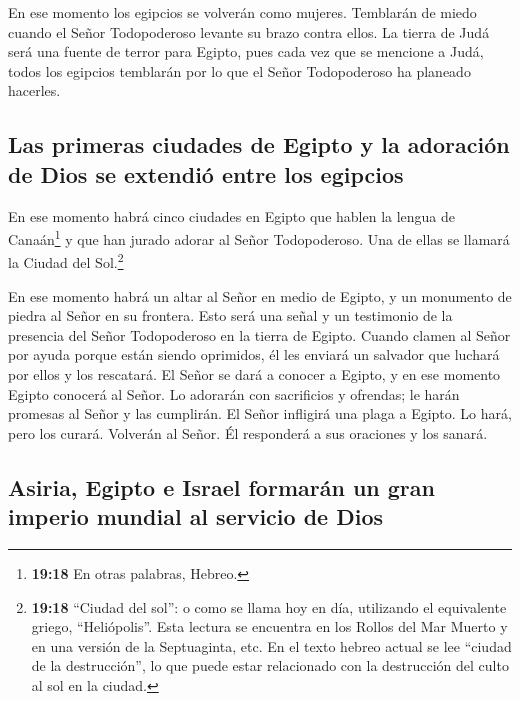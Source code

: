  En ese momento los egipcios se volverán como mujeres.
Temblarán de miedo cuando el Señor Todopoderoso levante su brazo contra
ellos.  La tierra de Judá será una fuente de terror para
Egipto, pues cada vez que se mencione a Judá, todos los egipcios
temblarán por lo que el Señor Todopoderoso ha planeado hacerles.

\hypertarget{las-primeras-ciudades-de-egipto-y-la-adoraciuxf3n-de-dios-se-extendiuxf3-entre-los-egipcios}{%
\subsection{Las primeras ciudades de Egipto y la adoración de Dios se
extendió entre los
egipcios}\label{las-primeras-ciudades-de-egipto-y-la-adoraciuxf3n-de-dios-se-extendiuxf3-entre-los-egipcios}}

 En ese momento habrá cinco ciudades en Egipto que hablen
la lengua de Canaán\footnote{\textbf{19:18} En otras palabras, Hebreo.}
y que han jurado adorar al Señor Todopoderoso. Una de ellas se llamará
la Ciudad del Sol.\footnote{\textbf{19:18} ``Ciudad del sol'': o como se
  llama hoy en día, utilizando el equivalente griego, ``Heliópolis''.
  Esta lectura se encuentra en los Rollos del Mar Muerto y en una
  versión de la Septuaginta, etc. En el texto hebreo actual se lee
  ``ciudad de la destrucción'', lo que puede estar relacionado con la
  destrucción del culto al sol en la ciudad.}

 En ese momento habrá un altar al Señor en medio de
Egipto, y un monumento de piedra al Señor en su frontera.
 Esto será una señal y un testimonio de la presencia del
Señor Todopoderoso en la tierra de Egipto. Cuando clamen al Señor por
ayuda porque están siendo oprimidos, él les enviará un salvador que
luchará por ellos y los rescatará.  El Señor se dará a
conocer a Egipto, y en ese momento Egipto conocerá al Señor. Lo adorarán
con sacrificios y ofrendas; le harán promesas al Señor y las cumplirán.
 El Señor infligirá una plaga a Egipto. Lo hará, pero los
curará. Volverán al Señor. Él responderá a sus oraciones y los sanará.

\hypertarget{asiria-egipto-e-israel-formaruxe1n-un-gran-imperio-mundial-al-servicio-de-dios}{%
\subsection{Asiria, Egipto e Israel formarán un gran imperio mundial al
servicio de
Dios}\label{asiria-egipto-e-israel-formaruxe1n-un-gran-imperio-mundial-al-servicio-de-dios}}

